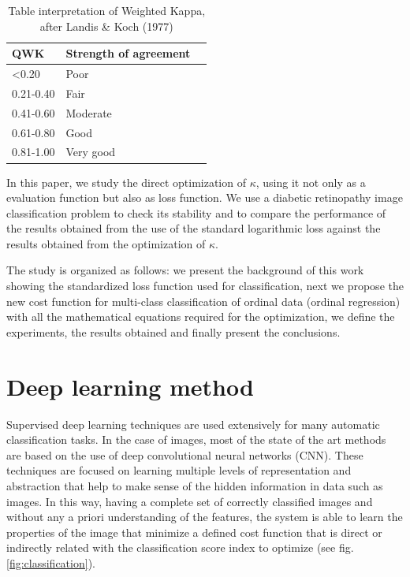 \documentclass[times,twocolumn,final,authoryear]{elsarticle}
\begin{document}
\begin{table}
	\caption{\label{tab:kappa_int}Table interpretation of Weighted Kappa, after Landis \& Koch (1977)}	
	\centering
	\begin{tabular}{llr}
		\hline
		QWK    & Strength of agreement \\
		\hline
		<0.20 		& Poor \\
		0.21-0.40 	& Fair \\
		0.41-0.60 	& Moderate \\
		0.61-0.80 	& Good \\
		0.81-1.00 	& Very good \\
		\hline
	\end{tabular}
\end{table}

In this paper, we study the direct optimization of $\kappa$, using it not only as a evaluation function but also as loss function. We use a diabetic retinopathy image classification problem to check its stability and to compare the performance of the results obtained from the use of the standard logarithmic loss against the results obtained from the optimization of $\kappa$.

The study is organized as follows: we present the background of this work showing the standardized loss function used for classification, next we propose the new cost function for multi-class classification of ordinal data (ordinal regression) with all the mathematical equations required for the optimization, we define the experiments, the results obtained and finally present the conclusions.

\section{Deep learning method}

Supervised deep learning techniques are used extensively for many automatic classification tasks. In the case of images, most of the state of the art methods are based on the use of deep convolutional neural networks (CNN). These techniques are focused on learning multiple levels of representation and abstraction that help to make sense of the hidden information in data such as images. In this way, having a complete set of correctly classified images and without any a priori understanding of the features, the system is able to learn the properties of the image that minimize a defined cost function that is direct or indirectly related with the classification score index to optimize (see fig. \ref{fig:classification}). 
\end{document}
